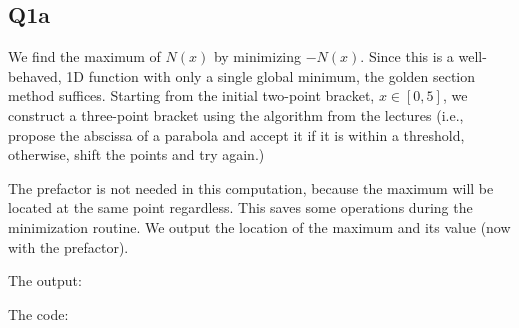 \subsection{Q1a}

We find the maximum of $N(x)$ by minimizing $-N(x)$. Since this is a well-behaved, 1D function 
with only a single global minimum, the golden section method suffices. Starting from the initial
two-point bracket, $x \in [0, 5]$, we construct a three-point bracket using the algorithm from 
the lectures (i.e., propose the abscissa of a parabola and accept it if it is within a threshold,
otherwise, shift the points and try again.)

The prefactor is not needed in this computation, because the maximum will be located at the same
point regardless. This saves some operations during the minimization routine. We output the location
of the maximum and its value (now with the prefactor).

\noindent The output:



\noindent The code:

